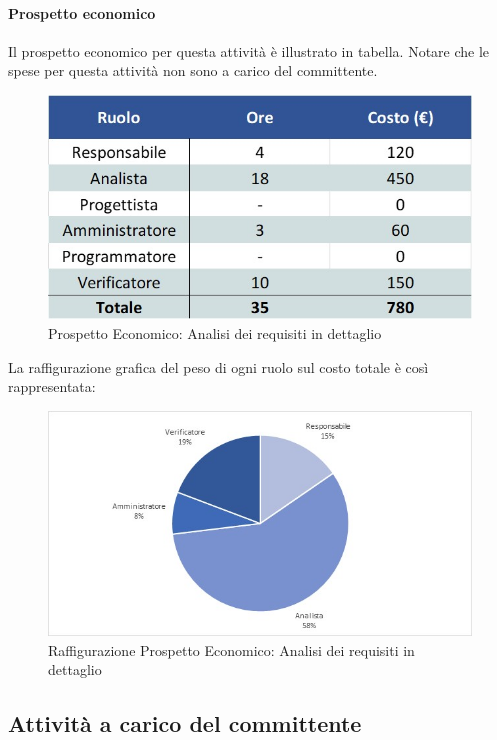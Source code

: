 \paragraph{Prospetto economico}
Il prospetto economico per questa attività è illustrato in tabella. Notare che le spese per questa attività non sono a carico del committente.
\begin{figure}[h!]
	\centerline{\includegraphics[scale=0.4]{img/Preventivo/AnalisiRequisitiDettaglio.Economico.jpg}}
	\caption{Prospetto Economico: Analisi dei requisiti in dettaglio}
\end{figure}
La raffigurazione grafica del peso di ogni ruolo sul costo totale è così rappresentata: 
\begin{figure}[h!]
	\centerline{\includegraphics[scale=0.4]{img/Preventivo/Torte/AnalisiRequisitiDettaglio.jpg}}
	\caption{Raffigurazione Prospetto Economico: Analisi dei requisiti in dettaglio}
\end{figure}

\subsection{Attività a carico del committente}
